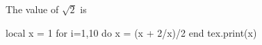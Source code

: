 \documentclass[border=10pt]{standalone}
\begin{document}
The value of $\sqrt{2}$ is \approx
\begin{luacode}
  local x = 1
  for i=1,10 do
    x = (x + 2/x)/2
  end
  tex.print(x)
\end{luacode}
\end{document}
